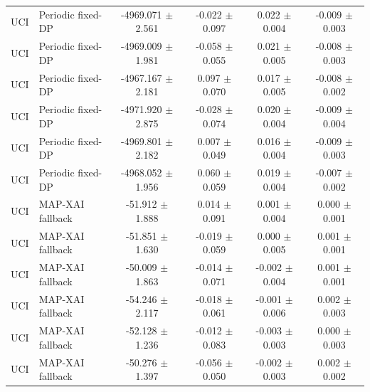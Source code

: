\begin{table}[t]
\begin{tabular}{llcccc}
UCI & Periodic fixed-DP & -4969.071 $\pm$ 2.561 & -0.022 $\pm$ 0.097 & 0.022 $\pm$ 0.004 & -0.009 $\pm$ 0.003 \\
UCI & Periodic fixed-DP & -4969.009 $\pm$ 1.981 & -0.058 $\pm$ 0.055 & 0.021 $\pm$ 0.005 & -0.008 $\pm$ 0.003 \\
UCI & Periodic fixed-DP & -4967.167 $\pm$ 2.181 & 0.097 $\pm$ 0.070 & 0.017 $\pm$ 0.005 & -0.008 $\pm$ 0.002 \\
UCI & Periodic fixed-DP & -4971.920 $\pm$ 2.875 & -0.028 $\pm$ 0.074 & 0.020 $\pm$ 0.004 & -0.009 $\pm$ 0.004 \\
UCI & Periodic fixed-DP & -4969.801 $\pm$ 2.182 & 0.007 $\pm$ 0.049 & 0.016 $\pm$ 0.004 & -0.009 $\pm$ 0.003 \\
UCI & Periodic fixed-DP & -4968.052 $\pm$ 1.956 & 0.060 $\pm$ 0.059 & 0.019 $\pm$ 0.004 & -0.007 $\pm$ 0.002 \\
UCI & MAP-XAI fallback & -51.912 $\pm$ 1.888 & 0.014 $\pm$ 0.091 & 0.001 $\pm$ 0.004 & 0.000 $\pm$ 0.001 \\
UCI & MAP-XAI fallback & -51.851 $\pm$ 1.630 & -0.019 $\pm$ 0.059 & 0.000 $\pm$ 0.005 & 0.001 $\pm$ 0.001 \\
UCI & MAP-XAI fallback & -50.009 $\pm$ 1.863 & -0.014 $\pm$ 0.071 & -0.002 $\pm$ 0.004 & 0.001 $\pm$ 0.001 \\
UCI & MAP-XAI fallback & -54.246 $\pm$ 2.117 & -0.018 $\pm$ 0.061 & -0.001 $\pm$ 0.006 & 0.002 $\pm$ 0.003 \\
UCI & MAP-XAI fallback & -52.128 $\pm$ 1.236 & -0.012 $\pm$ 0.083 & -0.003 $\pm$ 0.003 & 0.000 $\pm$ 0.003 \\
UCI & MAP-XAI fallback & -50.276 $\pm$ 1.397 & -0.056 $\pm$ 0.050 & -0.002 $\pm$ 0.003 & 0.002 $\pm$ 0.002 \\
\bottomrule
\end{tabular}
\end{table}
